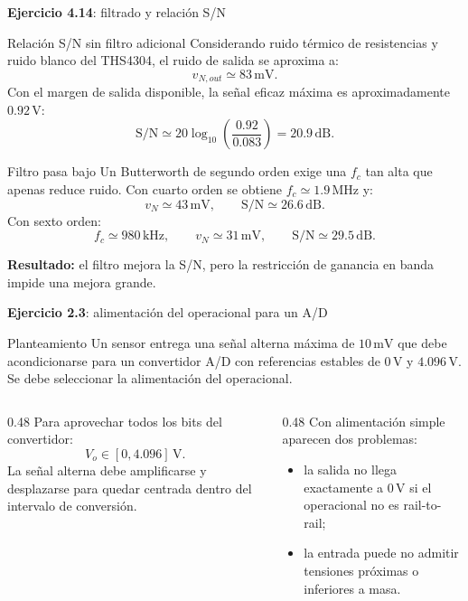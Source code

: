 \documentclass[aspectratio=169,9pt]{beamer}
\newcommand{\exercise}[1]{\textbf{Ejercicio #1}}
\newcommand{\result}[1]{\textbf{\color{eiTeal}Resultado:} #1}
\newcommand{\unit}[1]{\,\mathrm{#1}}
\newcommand{\SN}{\mathrm{S/N}}
\begin{document}
\begin{frame}[shrink=10]{\exercise{4.14}: filtrado y relación S/N}
  \begin{block}{Relación S/N sin filtro adicional}
    Considerando ruido térmico de resistencias y ruido blanco del THS4304, el ruido de salida se aproxima a:
    \[
      v_{N,out}\simeq 83\unit{mV}.
    \]
    Con el margen de salida disponible, la señal eficaz máxima es aproximadamente \(0.92\unit{V}\):
    \[
      \SN\simeq 20\log_{10}\left(\frac{0.92}{0.083}\right)=20.9\unit{dB}.
    \]
  \end{block}

  \begin{block}{Filtro pasa bajo}
    Un Butterworth de segundo orden exige una \(f_c\) tan alta que apenas reduce ruido. Con cuarto orden se obtiene \(f_c\simeq 1.9\unit{MHz}\) y:
    \[
      v_N\simeq 43\unit{mV},\qquad \SN\simeq 26.6\unit{dB}.
    \]
    Con sexto orden:
    \[
      f_c\simeq 980\unit{kHz},\qquad v_N\simeq 31\unit{mV},\qquad \SN\simeq 29.5\unit{dB}.
    \]
  \end{block}

  \result{el filtro mejora la S/N, pero la restricción de ganancia en banda impide una mejora grande.}
\end{frame}

\begin{frame}{\exercise{2.3}: alimentación del operacional para un A/D}
  \begin{block}{Planteamiento}
    Un sensor entrega una señal alterna máxima de \(10\unit{mV}\) que debe acondicionarse para un convertidor A/D con referencias estables de \(0\unit{V}\) y \(4.096\unit{V}\). Se debe seleccionar la alimentación del operacional.
  \end{block}

  \begin{columns}[T,onlytextwidth]
    \begin{column}{0.48\textwidth}
      Para aprovechar todos los bits del convertidor:
      \[
        V_o \in [0,4.096]\unit{V}.
      \]
      La señal alterna debe amplificarse y desplazarse para quedar centrada dentro del intervalo de conversión.
    \end{column}
    \begin{column}{0.48\textwidth}
      Con alimentación simple aparecen dos problemas:
      \begin{itemize}
        \item la salida no llega exactamente a \(0\unit{V}\) si el operacional no es rail-to-rail;
        \item la entrada puede no admitir tensiones próximas o inferiores a masa.
      \end{itemize}
    \end{column}
  \end{columns}
\end{frame}
\end{document}
